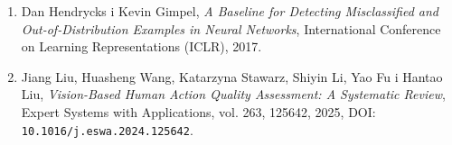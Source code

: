﻿\documentclass[12pt,a4paper]{report}
\begin{document}
\begin{enumerate}
  \item Dan Hendrycks i Kevin Gimpel, \textit{A Baseline for Detecting
  Misclassified and Out-of-Distribution Examples in Neural Networks},
  International Conference on Learning Representations (ICLR), 2017.

  \item Jiang Liu, Huasheng Wang, Katarzyna Stawarz, Shiyin Li, Yao Fu i Hantao
  Liu, \textit{Vision-Based Human Action Quality Assessment: A Systematic
  Review}, Expert Systems with Applications, vol. 263, 125642, 2025,
  DOI: \texttt{10.1016/j.eswa.2024.125642}.
\end{enumerate}
\end{document}
